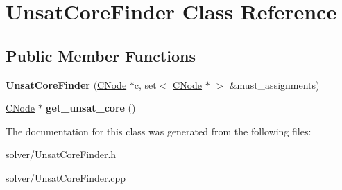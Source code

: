\hypertarget{classUnsatCoreFinder}{\section{\-Unsat\-Core\-Finder \-Class \-Reference}
\label{classUnsatCoreFinder}
}
\subsection*{\-Public \-Member \-Functions}
\begin{DoxyCompactItemize}
\item 
\hypertarget{classUnsatCoreFinder_a16ff7e8d507aa1cb8ff27a7ae8754ad6}{{\bfseries \-Unsat\-Core\-Finder} (\hyperlink{classCNode}{\-C\-Node} $\ast$c, set$<$ \hyperlink{classCNode}{\-C\-Node} $\ast$ $>$ \&must\-\_\-assignments)}\label{classUnsatCoreFinder_a16ff7e8d507aa1cb8ff27a7ae8754ad6}

\item 
\hypertarget{classUnsatCoreFinder_a51bc021408dd10564173025140d0fe1c}{\hyperlink{classCNode}{\-C\-Node} $\ast$ {\bfseries get\-\_\-unsat\-\_\-core} ()}\label{classUnsatCoreFinder_a51bc021408dd10564173025140d0fe1c}

\end{DoxyCompactItemize}


\-The documentation for this class was generated from the following files\-:\begin{DoxyCompactItemize}
\item 
solver/\-Unsat\-Core\-Finder.\-h\item 
solver/\-Unsat\-Core\-Finder.\-cpp\end{DoxyCompactItemize}
